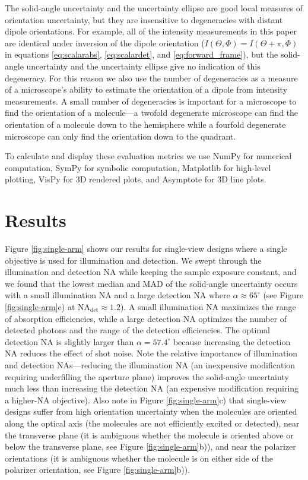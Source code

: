 \documentclass[10pt]{article}
\begin{document}
The solid-angle uncertainty and the uncertainty ellipse are good local measures
of orientation uncertainty, but they are insensitive to degeneracies with
distant dipole orientations. For example, all of the intensity measurements in
this paper are identical under inversion of the dipole orientation
($I(\Theta, \Phi) = I(\Theta + \pi, \Phi)$ in equations \ref{eq:scalarabs},
\ref{eq:scalardet}, and \ref{eq:forward_frame}), but the solid-angle uncertainty
and the uncertainty ellipse give no indication of this degeneracy. For this
reason we also use the number of degeneracies as a measure of a microscope's
ability to estimate the orientation of a dipole from intensity measurements. A
small number of degeneracies is important for a microscope to find the
orientation of a molecule---a twofold degenerate microscope can find the
orientation of a molecule down to the hemisphere while a fourfold degenerate
microscope can only find the orientation down to the quadrant.

To calculate and display these evaluation metrics we use NumPy \cite{walt2011}
for numerical computation, SymPy \cite{meurer2017} for symbolic computation,
Matplotlib \cite{hunter2007} for high-level plotting, VisPy \cite{vispy} for 3D
rendered plots, and Asymptote \cite{bowman2008} for 3D line plots.

\section{Results}\label{results}
Figure \ref{fig:single-arm} shows our results for single-view designs where a
single objective is used for illumination and detection. We swept through the
illumination and detection NA while keeping the sample exposure constant, and we
found that the lowest median and MAD of the solid-angle uncertainty occurs with
a small illumination NA and a large detection NA where
$\alpha \approx 65^{\circ}$ (see Figure \ref{fig:single-arm}e) at
NA${}_{\text{det}} \approx 1.2$). A small illumination NA maximizes the range of
absorption efficiencies, while a large detection NA optimizes the number of
detected photons and the range of the detection efficiencies. The optimal
detection NA is slightly larger than $\alpha = 57.4^{\circ}$ because increasing
the detection NA reduces the effect of shot noise. Note the relative importance
of illumination and detection NAs---reducing the illumination NA (an inexpensive
modification requiring underfilling the aperture plane) improves the solid-angle
uncertainty much less than increasing the detection NA (an expensive
modification requiring a higher-NA objective). Also note in Figure
\ref{fig:single-arm}c) that single-view designs suffer from high orientation
uncertainty when the molecules are oriented along the optical axis (the
molecules are not efficiently excited or detected), near the transverse plane
(it is ambiguous whether the molecule is oriented above or below the transverse
plane, see Figure \ref{fig:single-arm}b)), and near the polarizer orientations
(it is ambiguous whether the molecule is on either side of the polarizer
orientation, see Figure \ref{fig:single-arm}b)).
\end{document}
